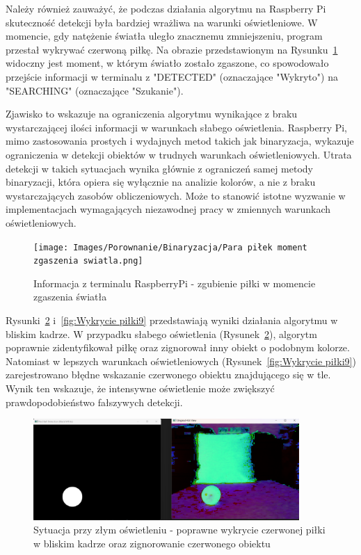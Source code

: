 \documentclass[a4paper,twoside,12pt]{book}
\begin{document}
Należy również zauważyć, że podczas działania algorytmu na Raspberry Pi skuteczność detekcji była bardziej wrażliwa na warunki oświetleniowe. W momencie, gdy natężenie światła uległo znacznemu zmniejszeniu, program przestał wykrywać czerwoną piłkę. Na obrazie przedstawionym na Rysunku~\ref{fig:Wykrycie piłki Rasp} widoczny jest moment, w którym światło zostało zgaszone, co spowodowało przejście informacji w terminalu z "DETECTED" (oznaczające "Wykryto") na "SEARCHING" (oznaczające "Szukanie").


Zjawisko to wskazuje na ograniczenia algorytmu wynikające z braku wystarczającej ilości informacji w warunkach słabego oświetlenia. Raspberry Pi, mimo zastosowania prostych i wydajnych metod takich jak binaryzacja, wykazuje ograniczenia w detekcji obiektów w trudnych warunkach oświetleniowych. Utrata detekcji w takich sytuacjach wynika głównie z ograniczeń samej metody binaryzacji, która opiera się wyłącznie na analizie kolorów, a nie z braku wystarczających zasobów obliczeniowych.
Może to stanowić istotne wyzwanie w implementacjach wymagających niezawodnej pracy w zmiennych warunkach oświetleniowych.

\begin{figure}[h]
    \centering
    \texttt{[image: Images/Porownanie/Binaryzacja/Para piłek moment zgaszenia swiatla.png]}
    \caption{Informacja z terminalu RaspberryPi - zgubienie piłki w momencie zgaszenia światła}
    \label{fig:Wykrycie piłki Rasp}
\end{figure}


\newpage

Rysunki~\ref{fig:Wykrycie piłki8} i~\ref{fig:Wykrycie piłki9} przedstawiają wyniki działania algorytmu w bliskim kadrze. W przypadku słabego oświetlenia (Rysunek~\ref{fig:Wykrycie piłki8}), algorytm poprawnie zidentyfikował piłkę oraz zignorował inny obiekt o podobnym kolorze. Natomiast w lepszych warunkach oświetleniowych (Rysunek~\ref{fig:Wykrycie piłki9}) zarejestrowano błędne wskazanie czerwonego obiektu znajdującego się w tle. Wynik ten wskazuje, że intensywne oświetlenie może zwiększyć prawdopodobieństwo fałszywych detekcji.

\begin{figure}[h]
    \centering
    \includegraphics[width=0.9\textwidth]{Images/Porownanie/Binaryzacja/Zrzut ekranu 2025-01-02 193840.png}
    \caption{Sytuacja przy złym oświetleniu - poprawne wykrycie czerwonej piłki w bliskim kadrze oraz zignorowanie czerwonego obiektu}
    \label{fig:Wykrycie piłki8}
\end{figure}
\end{document}
